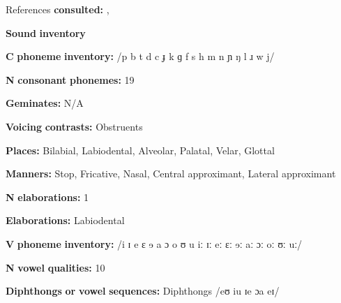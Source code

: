 \documentclass[output=paper]{langsci/langscibook}
\begin{document}
\begin{styleBody}
References \textbf{consulted:} \citet{Lavergne1979}, \citet{Sapir1965}
\end{styleBody}

\begin{styleBody}
\textbf{Sound} \textbf{inventory}
\end{styleBody}

\begin{styleBody}
\textbf{C} \textbf{phoneme} \textbf{inventory:} /p b t d c ɟ k ɡ f s h m n ɲ ŋ l ɹ w j/
\end{styleBody}

\begin{styleBody}
\textbf{N} \textbf{consonant} \textbf{phonemes:} 19
\end{styleBody}

\begin{styleBody}
\textbf{Geminates:} N/A
\end{styleBody}

\begin{styleBody}
\textbf{Voicing} \textbf{contrasts:} Obstruents
\end{styleBody}

\begin{styleBody}
\textbf{Places:} Bilabial, Labiodental, Alveolar, Palatal, Velar, Glottal
\end{styleBody}

\begin{styleBody}
\textbf{Manners:} Stop, Fricative, Nasal, Central approximant, Lateral approximant
\end{styleBody}

\begin{styleBody}
\textbf{N} \textbf{elaborations:} 1
\end{styleBody}

\begin{styleBody}
\textbf{Elaborations:} Labiodental
\end{styleBody}

\begin{styleBody}
\textbf{V} \textbf{phoneme} \textbf{inventory:} /i ɪ e ɛ ɘ a ɔ o ʊ u iː ɪː eː ɛː ɘː aː ɔː oː ʊː uː/
\end{styleBody}

\begin{styleBody}
\textbf{N} \textbf{vowel} \textbf{qualities:} 10
\end{styleBody}

\begin{styleBody}
\textbf{Diphthongs} \textbf{or} \textbf{vowel} \textbf{sequences:} Diphthongs /eʊ iu ɪe ɔa eɪ/
\end{styleBody}
\end{document}
